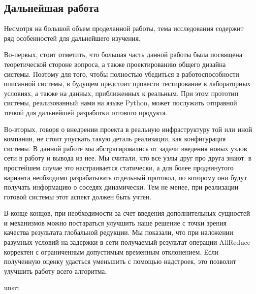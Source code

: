 \documentclass{article}
\theoremstyle{plain}
\theoremstyle{plain}
\theoremstyle{plain}
\theoremstyle{plain}
\theoremstyle{definition}
\theoremstyle{remark}
\theoremstyle{plain}
\begin{document}
\subsection{Дальнейшая работа}

Несмотря на большой объем проделанной работы, тема исследования содержит ряд особенностей для дальнейшего изучения.

Во-первых, стоит отметить, что большая часть данной работы была посвящена теоретической стороне вопроса, а также проектированию общего дизайна системы. Поэтому для того, чтобы полностью убедиться в работоспособности описанной системы, в будущем предстоит провести тестирование в лабораторных условиях, а также на данных, приближенных к реальным. При этом прототип системы, реализованный нами на языке Python, может послужить отправной точкой для дальнейшей разработки готового продукта.

Во-вторых, говоря о внедрении проекта в реальную инфраструктуру той или иной компании, не стоит упускать такую деталь реализации, как конфигурация системы. В данной работе мы абстрагировались от задачи введения новых узлов сети в работу и вывода из нее. Мы считали, что все узлы друг про друга знают: в простейшем случае это настраивается статически, а для более продвинутого варианта необходимо разрабатывать отдельный протокол, по которому они будут получать информацию о соседях динамически. Тем не менее, при реализации готовой системы этот аспект должен быть учтен.

В конце концов, при необходимости за счет введения дополнительных сущностей и механизмов можно постараться улучшить наше решение с точки зрения качества результата глобальной редукции. Мы показали, что при наложении разумных условий на задержки в сети получаемый результат операции AllReduce корректен с ограниченным допустимым временным отклонением. Если полученную оценку удасться уменьшить с помощью надстроек, это позволит улучшить работу всего алгоритма.

\clearpage

 {unsrt}


\clearpage

\end{document}

